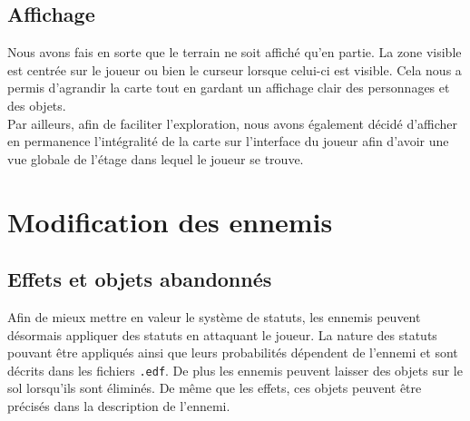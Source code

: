 \documentclass[10pt,a4paper]{article}
\begin{document}
\subsection{Affichage}
Nous avons fais en sorte que le terrain ne soit affiché qu'en partie. La zone visible est centrée sur le joueur ou bien le curseur lorsque celui-ci est visible. Cela nous a permis d'agrandir la carte tout en gardant un affichage clair des personnages et des objets.\\
Par ailleurs, afin de faciliter l'exploration, nous avons également décidé d'afficher en permanence l'intégralité de la carte sur l'interface du joueur afin d'avoir une vue globale de l'étage dans lequel le joueur se trouve.

\section{Modification des ennemis}
\subsection{Effets et objets abandonnés}
Afin de mieux mettre en valeur le système de statuts, les ennemis peuvent désormais appliquer des statuts en attaquant le joueur. La nature des statuts pouvant être appliqués ainsi que leurs probabilités dépendent de l'ennemi et sont décrits dans les fichiers \texttt{.edf}. De plus les ennemis peuvent laisser des objets sur le sol lorsqu'ils sont éliminés. De même que les effets, ces objets peuvent être précisés dans la description de l'ennemi.
\end{document}
